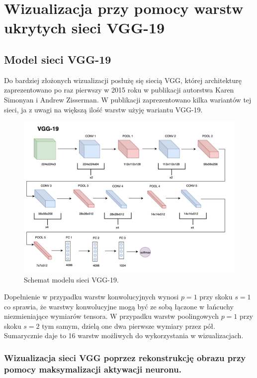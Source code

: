 \chapter{Wizualizacja przy pomocy warstw ukrytych sieci VGG-19}
\label{chap:vgg}
\section{Model sieci VGG-19}
\label{vgg-model}

Do bardziej złożonych wizualizacji posłużę się siecią VGG, której architekturę zaprezentowano po raz pierwszy w 2015 roku w publikacji autorstwa Karen Simonyan i 
Andrew Zisserman\cite{vggpaper}. W publikacji zaprezentowano kilka wariantów tej sieci, ja z uwagi na większą ilość warstw użyję wariantu VGG-19.

\begin{figure}[ht]
\centerline{\includegraphics[scale=0.5]{resources/vgg19.png}}
\caption{Schemat modelu sieci VGG-19.}
\label{fig:vgg19-schemat}
\end{figure}

Dopełnienie w przypadku warstw konwolucyjnych wynosi \(p=1\) przy skoku \(s=1\) co sprawia, że warstwy konwolucyjne mogą być ze sobą łączone w łańcuchy niezmieniające wymiarów tensora. W przypadku warstw poolingowych \(p=1\) przy skoku \(s=2\) tym samym, dzielą one dwa pierwsze wymiary przez pół. Sumarycznie daje to 16 warstw możliwych do wykorzystania w wizualizacjach.

\subsection{Wizualizacja sieci VGG poprzez rekonstrukcję obrazu przy pomocy maksymalizacji aktywacji neuronu.}
\label{vgg-mean-activation}

